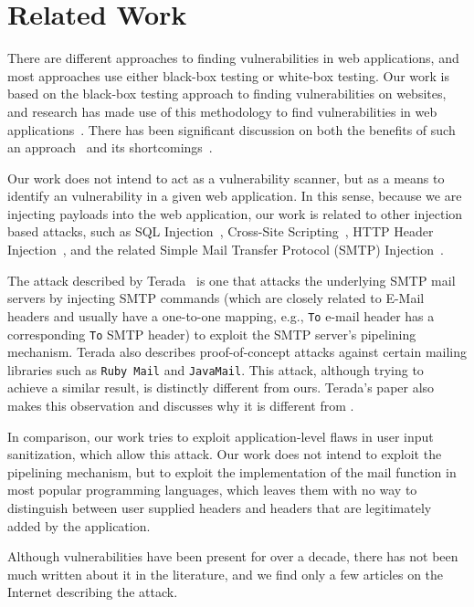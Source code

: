 \section{Related Work}

There are different approaches to finding vulnerabilities in web applications, and most approaches use either black-box testing or white-box testing.
Our work is based on the black-box testing approach to finding vulnerabilities on websites, and research has made use of this methodology to find vulnerabilities in web applications~\cite{Beizer:1995:BTT:202699,Huang,kals2006secubat,payet13:ears-in-the-wild,zanero2005automatic}. There has been significant discussion on both the benefits of such an approach~\cite{black-box} and its shortcomings~\cite{Doupe2012,Doupe2010}.

Our work does not intend to act as a vulnerability scanner, but as a means to identify an \ehi vulnerability in a given web application. In this sense, because we are injecting payloads into the web application, our work is related to other injection based attacks, such as SQL Injection~\cite{sql1,sql0,sql2}, Cross-Site Scripting~\cite{Injection1,KleinAmit}, HTTP Header Injection~\cite{sessionride}, and the related Simple Mail Transfer Protocol (SMTP) Injection~\cite{Terada2015}.

The attack described by Terada~\cite{Terada2015} is one that attacks the underlying SMTP mail servers by injecting SMTP commands (which are closely related to E-Mail headers and usually have a one-to-one mapping, e.g., \texttt{To} e-mail header has a corresponding \texttt{To} SMTP header) to exploit the SMTP server's pipelining mechanism. Terada also describes proof-of-concept attacks against certain mailing libraries such as \texttt{Ruby Mail} and \texttt{JavaMail}. This attack, although trying to achieve a similar result, is distinctly different from ours. Terada's paper also makes this observation and discusses why it is different from \ehi.

In comparison, our work tries to exploit application-level flaws in user input sanitization, which allow this attack. Our work does not intend to exploit the pipelining mechanism, but to exploit the implementation of the mail function in most popular programming languages, which leaves them with no way to distinguish between user supplied headers and headers that are legitimately added by the application.

Although \ehi vulnerabilities have been present for over a decade, there has not been much written about it in the literature, and we find only a few articles on the Internet describing the attack.

